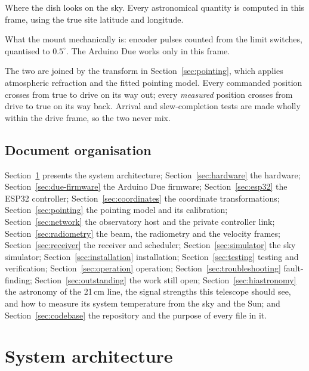 \documentclass[11pt,a4paper]{article}
\begin{document}
\begin{description}[style=nextline]
    \item[True alt/az] Where the dish looks on the sky. Every astronomical quantity is computed in this frame, using the true site latitude and longitude.
    \item[Drive] What the mount mechanically is: encoder pulses counted from the limit switches, quantised to $0.5^\circ$. The Arduino Due works only in this frame.
\end{description}

The two are joined by the transform in Section~\ref{sec:pointing}, which applies atmospheric refraction and the fitted pointing model. Every commanded position crosses from true to drive on its way out; every \emph{measured} position crosses from drive to true on its way back. Arrival and slew-completion tests are made wholly within the drive frame, so the two never mix.

\subsection{Document organisation}

Section~\ref{sec:architecture} presents the system architecture; Section~\ref{sec:hardware} the hardware; Section~\ref{sec:due-firmware} the Arduino Due firmware; Section~\ref{sec:esp32} the ESP32 controller; Section~\ref{sec:coordinates} the coordinate transformations; Section~\ref{sec:pointing} the pointing model and its calibration; Section~\ref{sec:network} the observatory host and the private controller link; Section~\ref{sec:radiometry} the beam, the radiometry and the velocity frames; Section~\ref{sec:receiver} the receiver and scheduler; Section~\ref{sec:simulator} the sky simulator; Section~\ref{sec:installation} installation; Section~\ref{sec:testing} testing and verification; Section~\ref{sec:operation} operation; Section~\ref{sec:troubleshooting} fault-finding; Section~\ref{sec:outstanding} the work still open; Section~\ref{sec:hiastronomy} the astronomy of the 21\,cm line, the signal strengths this telescope should see, and how to measure its system temperature from the sky and the Sun; and Section~\ref{sec:codebase} the repository and the purpose of every file in it.

\section{System architecture}
\label{sec:architecture}
\end{document}
